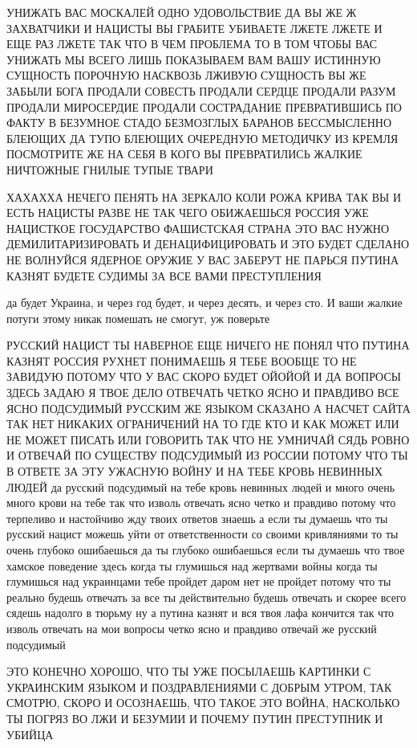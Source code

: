 УНИЖАТЬ ВАС МОСКАЛЕЙ ОДНО УДОВОЛЬСТВИЕ ДА ВЫ ЖЕ Ж ЗАХВАТЧИКИ И НАЦИСТЫ ВЫ
ГРАБИТЕ УБИВАЕТЕ ЛЖЕТЕ ЛЖЕТЕ И ЕЩЕ РАЗ ЛЖЕТЕ ТАК ЧТО В ЧЕМ ПРОБЛЕМА ТО В ТОМ
ЧТОБЫ ВАС УНИЖАТЬ МЫ ВСЕГО ЛИШЬ ПОКАЗЫВАЕМ ВАМ ВАШУ ИСТИННУЮ СУЩНОСТЬ ПОРОЧНУЮ
НАСКВОЗЬ ЛЖИВУЮ СУЩНОСТЬ ВЫ ЖЕ ЗАБЫЛИ БОГА ПРОДАЛИ СОВЕСТЬ ПРОДАЛИ СЕРДЦЕ
ПРОДАЛИ РАЗУМ ПРОДАЛИ МИРОСЕРДИЕ ПРОДАЛИ СОСТРАДАНИЕ ПРЕВРАТИВШИСЬ ПО ФАКТУ В
БЕЗУМНОЕ СТАДО БЕЗМОЗГЛЫХ БАРАНОВ БЕССМЫСЛЕННО БЛЕЮЩИХ ДА ТУПО БЛЕЮЩИХ
ОЧЕРЕДНУЮ МЕТОДИЧКУ ИЗ КРЕМЛЯ ПОСМОТРИТЕ ЖЕ НА СЕБЯ В КОГО ВЫ ПРЕВРАТИЛИСЬ
ЖАЛКИЕ НИЧТОЖНЫЕ ГНИЛЫЕ ТУПЫЕ ТВАРИ

ХАХАХХА НЕЧЕГО ПЕНЯТЬ НА ЗЕРКАЛО КОЛИ РОЖА КРИВА ТАК ВЫ И ЕСТЬ НАЦИСТЫ РАЗВЕ НЕ
ТАК ЧЕГО ОБИЖАЕШЬСЯ РОССИЯ УЖЕ НАЦИСТКОЕ ГОСУДАРСТВО ФАШИСТСКАЯ СТРАНА ЭТО ВАС
НУЖНО ДЕМИЛИТАРИЗИРОВАТЬ И ДЕНАЦИФИЦИРОВАТЬ И ЭТО БУДЕТ СДЕЛАНО НЕ ВОЛНУЙСЯ
ЯДЕРНОЕ ОРУЖИЕ У ВАС ЗАБЕРУТ НЕ ПАРЬСЯ ПУТИНА КАЗНЯТ БУДЕТЕ СУДИМЫ ЗА ВСЕ ВАМИ
ПРЕСТУПЛЕНИЯ

да будет Украина, и через год будет, и через десять, и через сто. И ваши жалкие
потуги этому никак помешать не смогут, уж поверьте

РУССКИЙ НАЦИСТ ТЫ НАВЕРНОЕ ЕЩЕ НИЧЕГО НЕ ПОНЯЛ ЧТО ПУТИНА КАЗНЯТ РОССИЯ РУХНЕТ
ПОНИМАЕШЬ Я ТЕБЕ ВООБЩЕ ТО НЕ ЗАВИДУЮ ПОТОМУ ЧТО У ВАС СКОРО БУДЕТ ОЙОЙОЙ И ДА
ВОПРОСЫ ЗДЕСЬ ЗАДАЮ Я ТВОЕ ДЕЛО ОТВЕЧАТЬ ЧЕТКО ЯСНО И ПРАВДИВО ВСЕ ЯСНО
ПОДСУДИМЫЙ РУССКИМ ЖЕ ЯЗЫКОМ СКАЗАНО А НАСЧЕТ САЙТА ТАК НЕТ НИКАКИХ ОГРАНИЧЕНИЙ
НА ТО ГДЕ КТО И КАК МОЖЕТ ИЛИ НЕ МОЖЕТ ПИСАТЬ ИЛИ ГОВОРИТЬ ТАК ЧТО НЕ УМНИЧАЙ
СЯДЬ РОВНО И ОТВЕЧАЙ ПО СУЩЕСТВУ ПОДСУДИМЫЙ ИЗ РОССИИ ПОТОМУ ЧТО ТЫ В ОТВЕТЕ ЗА
ЭТУ УЖАСНУЮ ВОЙНУ И НА ТЕБЕ КРОВЬ НЕВИННЫХ ЛЮДЕЙ да русский подсудимый на тебе
кровь невинных людей и много очень много крови на тебе так что изволь отвечать
ясно четко и правдиво потому что терпеливо и настойчиво жду твоих ответов
знаешь а если ты думаешь что ты русский нацист можешь уйти от ответственности
со своими кривляниями то ты очень глубоко ошибаешься да ты глубоко ошибаешься
если ты думаешь что твое хамское поведение здесь когда ты глумишься над
жертвами войны когда ты глумишься над украинцами тебе пройдет даром нет не
пройдет потому что ты реально будешь отвечать за все ты действительно будешь
отвечать и скорее всего сядешь надолго в тюрьму ну а путина казнят и вся твоя
лафа кончится так что изволь отвечать на мои вопросы четко ясно и правдиво
отвечай же русский подсудимый

ЭТО КОНЕЧНО ХОРОШО, ЧТО ТЫ УЖЕ ПОСЫЛАЕШЬ КАРТИНКИ С УКРАИНСКИМ ЯЗЫКОМ И
ПОЗДРАВЛЕНИЯМИ С ДОБРЫМ УТРОМ, ТАК СМОТРЮ, СКОРО И ОСОЗНАЕШЬ, ЧТО ТАКОЕ ЭТО
ВОЙНА, НАСКОЛЬКО ТЫ ПОГРЯЗ ВО ЛЖИ И БЕЗУМИИ И ПОЧЕМУ ПУТИН ПРЕСТУПНИК И УБИЙЦА

